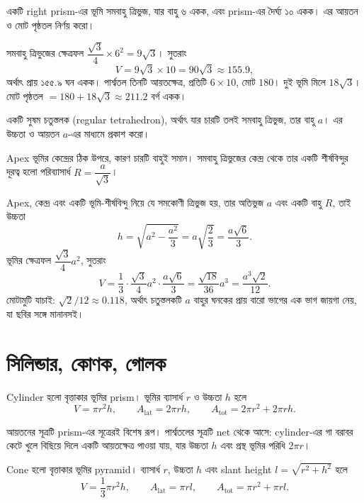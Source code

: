 \documentclass[11pt]{article}
\begin{document}
 একটি right prism-এর ভূমি সমবাহু ত্রিভুজ, যার বাহু ৬ একক, এবং prism-এর
দৈর্ঘ্য ১০ একক। এর আয়তন ও মোট পৃষ্ঠতল নির্ণয় করো।

\begin{sol}
সমবাহু ত্রিভুজের ক্ষেত্রফল $\dfrac{\sqrt{3}}{4} \times 6^{2} = 9\sqrt{3}$।
সুতরাং
\[
  V = 9\sqrt{3} \times 10 = 90\sqrt{3} \approx 155.9 ,
\]
অর্থাৎ প্রায় ১৫৫.৯ ঘন একক।
পার্শ্বতল তিনটি আয়তক্ষেত্র, প্রতিটি $6 \times 10$, মোট $180$। দুই ভূমি মিলে
$18\sqrt{3}$। মোট পৃষ্ঠতল $= 180 + 18\sqrt{3} \approx 211.2$ বর্গ একক।
\end{sol}

 একটি সুষম চতুস্তলক (regular tetrahedron), অর্থাৎ যার চারটি তলই সমবাহু
ত্রিভুজ, তার বাহু $a$। এর উচ্চতা ও আয়তন $a$-এর মাধ্যমে প্রকাশ করো।

\begin{sol}
Apex ভূমির কেন্দ্রের ঠিক উপরে, কারণ চারটি বাহুই সমান। সমবাহু ত্রিভুজের কেন্দ্র
থেকে তার একটি শীর্ষবিন্দুর দূরত্ব হলো পরিব্যাসার্ধ $R = \dfrac{a}{\sqrt{3}}$।

Apex, কেন্দ্র এবং একটি ভূমি-শীর্ষবিন্দু নিয়ে যে সমকোণী ত্রিভুজ হয়, তার অতিভুজ
$a$ এবং একটি বাহু $R$, তাই উচ্চতা
\[
  h = \sqrt{a^{2} - \frac{a^{2}}{3}} = a\sqrt{\frac{2}{3}} = \frac{a\sqrt{6}}{3} .
\]
ভূমির ক্ষেত্রফল $\dfrac{\sqrt{3}}{4}a^{2}$, সুতরাং
\[
  V = \frac{1}{3} \cdot \frac{\sqrt{3}}{4}a^{2} \cdot \frac{a\sqrt{6}}{3}
    = \frac{\sqrt{18}}{36} a^{3} = \frac{a^{3}\sqrt{2}}{12} .
\]
মোটামুটি যাচাই: $\sqrt{2}/12 \approx 0.118$, অর্থাৎ চতুস্তলকটি $a$ বাহুর ঘনকের
প্রায় বারো ভাগের এক ভাগ জায়গা নেয়, যা ছবির সঙ্গে মানানসই।
\end{sol}

\section{সিলিন্ডার, কোণক, গোলক}

\begin{idea}[Cylinder]
Cylinder হলো বৃত্তাকার ভূমির prism। ভূমির ব্যাসার্ধ $r$ ও উচ্চতা $h$ হলে
\[
  V = \pi r^{2} h, \qquad
  A_{\mathrm{lat}} = 2\pi r h, \qquad
  A_{\mathrm{tot}} = 2\pi r^{2} + 2\pi r h .
\]
\end{idea}

আয়তনের সূত্রটি prism-এর সূত্রেরই বিশেষ রূপ। পার্শ্বতলের সূত্রটি net থেকে আসে:
cylinder-এর গা বরাবর কেটে খুলে বিছিয়ে দিলে একটি আয়তক্ষেত্র পাওয়া যায়, যার
উচ্চতা $h$ এবং প্রস্থ ভূমির পরিধি $2\pi r$।

\begin{idea}[Cone]
Cone হলো বৃত্তাকার ভূমির pyramid। ব্যাসার্ধ $r$, উচ্চতা $h$ এবং slant height
$l = \sqrt{r^{2}+h^{2}}$ হলে
\[
  V = \frac{1}{3}\pi r^{2} h, \qquad
  A_{\mathrm{lat}} = \pi r l, \qquad
  A_{\mathrm{tot}} = \pi r^{2} + \pi r l .
\]
\end{idea}
\end{document}
